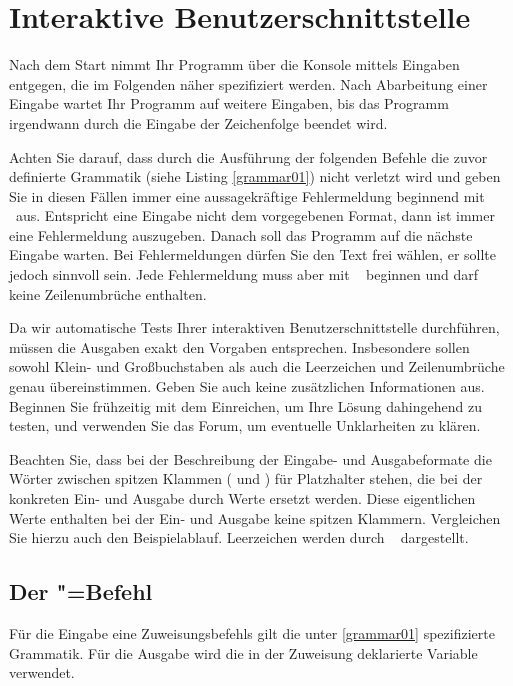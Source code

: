 \documentclass{sdqassignment}
\begin{document}

\section{Interaktive Benutzerschnittstelle}
Nach dem Start nimmt Ihr Programm über die Konsole mittels  Eingaben entgegen, die im Folgenden näher spezifiziert werden. Nach Abarbeitung einer Eingabe wartet Ihr Programm auf weitere Eingaben, bis das Programm irgendwann durch die Eingabe der Zeichenfolge  beendet wird.

Achten Sie darauf, dass durch die Ausführung der folgenden Befehle die zuvor definierte Grammatik (siehe Listing \ref{grammar01}) nicht verletzt wird und geben Sie in diesen Fällen immer eine aussagekräftige Fehlermeldung  beginnend mit \textvisiblespace\ aus.
Entspricht eine Eingabe nicht dem vorgegebenen Format, dann ist immer eine Fehlermeldung auszugeben.
Danach soll das Programm auf die nächste Eingabe warten.
Bei Fehlermeldungen dürfen Sie den Text frei wählen, er sollte jedoch sinnvoll sein.
Jede Fehlermeldung muss aber mit \textvisiblespace~ beginnen und darf keine Zeilenumbrüche enthalten.

Da wir automatische Tests Ihrer interaktiven Benutzerschnittstelle durchführen, müssen die Ausgaben exakt den Vorgaben entsprechen.
Insbesondere sollen sowohl Klein- und Großbuchstaben als auch die Leerzeichen und Zeilenumbrüche genau übereinstimmen.
Geben Sie auch keine zusätzlichen Informationen aus.
Beginnen Sie frühzeitig mit dem Einreichen, um Ihre Lösung dahingehend zu testen, und verwenden Sie das Forum, um eventuelle Unklarheiten zu klären.

Beachten Sie, dass bei der Beschreibung der Eingabe- und Ausgabeformate die Wörter zwischen spitzen Klammen (\lstinlinetxt{<} und \lstinlinetxt{>}) für Platzhalter stehen, die bei der konkreten Ein- und Ausgabe durch Werte ersetzt werden.
Diese eigentlichen Werte enthalten bei der Ein- und Ausgabe keine spitzen Klammern.
Vergleichen Sie hierzu auch den Beispielablauf. Leerzeichen werden durch \textvisiblespace~ dargestellt.

\subsection{Der "=Befehl}
Für die Eingabe eine Zuweisungsbefehls gilt die unter \ref{grammar01} spezifizierte Grammatik. Für die Ausgabe wird die in der Zuweisung deklarierte Variable verwendet.
\end{document}
